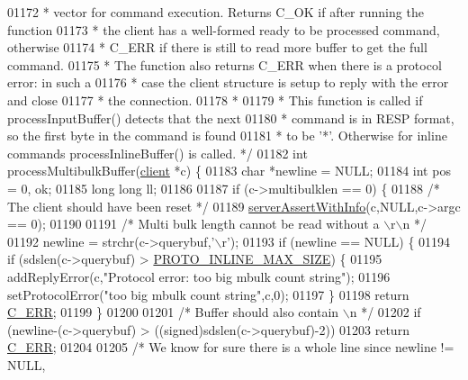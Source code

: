 \begin{DoxyCode}
{{{{{{{{{{{{{{01172 \textcolor{comment}{ * vector for command execution. Returns C\_OK if after running the function}
01173 \textcolor{comment}{ * the client has a well-formed ready to be processed command, otherwise}
01174 \textcolor{comment}{ * C\_ERR if there is still to read more buffer to get the full command.}
01175 \textcolor{comment}{ * The function also returns C\_ERR when there is a protocol error: in such a}
01176 \textcolor{comment}{ * case the client structure is setup to reply with the error and close}
01177 \textcolor{comment}{ * the connection.}
01178 \textcolor{comment}{ *}
01179 \textcolor{comment}{ * This function is called if processInputBuffer() detects that the next}
01180 \textcolor{comment}{ * command is in RESP format, so the first byte in the command is found}
01181 \textcolor{comment}{ * to be '*'. Otherwise for inline commands processInlineBuffer() is called. */}
01182 \textcolor{keywordtype}{int} processMultibulkBuffer(\hyperlink{structclient}{client} *c) \{
01183     \textcolor{keywordtype}{char} *newline = NULL;
01184     \textcolor{keywordtype}{int} pos = 0, ok;
01185     \textcolor{keywordtype}{long} \textcolor{keywordtype}{long} ll;
01186 
01187     \textcolor{keywordflow}{if} (c->multibulklen == 0) \{
01188         \textcolor{comment}{/* The client should have been reset */}
01189         \hyperlink{server_8h_a7308f76cbff9a8d3797fe78190b91282}{serverAssertWithInfo}(c,NULL,c->argc == 0);
01190 
01191         \textcolor{comment}{/* Multi bulk length cannot be read without a \(\backslash\)r\(\backslash\)n */}
01192         newline = strchr(c->querybuf,\textcolor{stringliteral}{'\(\backslash\)r'});
01193         \textcolor{keywordflow}{if} (newline == NULL) \{
01194             \textcolor{keywordflow}{if} (sdslen(c->querybuf) > \hyperlink{server_8h_a8214e9e04b3a27e8e38d35cda0f55874}{PROTO\_INLINE\_MAX\_SIZE}) \{
01195                 addReplyError(c,\textcolor{stringliteral}{"Protocol error: too big mbulk count string"});
01196                 setProtocolError(\textcolor{stringliteral}{"too big mbulk count string"},c,0);
01197             \}
01198             \textcolor{keywordflow}{return} \hyperlink{server_8h_af98ac28d5f4d23d7ed5985188e6fb7d1}{C\_ERR};
01199         \}
01200 
01201         \textcolor{comment}{/* Buffer should also contain \(\backslash\)n */}
01202         \textcolor{keywordflow}{if} (newline-(c->querybuf) > ((\textcolor{keywordtype}{signed})sdslen(c->querybuf)-2))
01203             \textcolor{keywordflow}{return} \hyperlink{server_8h_af98ac28d5f4d23d7ed5985188e6fb7d1}{C\_ERR};
01204 
01205         \textcolor{comment}{/* We know for sure there is a whole line since newline != NULL,}
}}}}}}}}}}}}}}
\end{DoxyCode}
